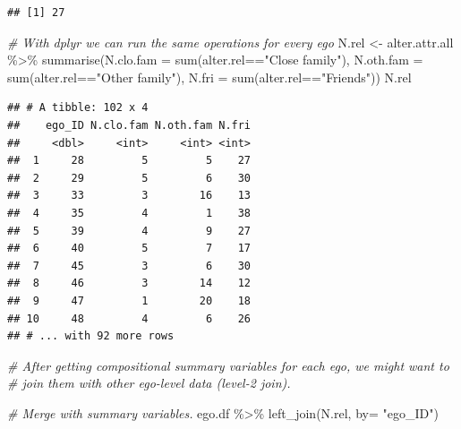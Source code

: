 \documentclass[
]{book}
\newenvironment{Shaded}{\begin{snugshade}}{\end{snugshade}}
\newcommand{\AttributeTok}[1]{\textcolor[rgb]{0.77,0.63,0.00}{#1}}
\newcommand{\CommentTok}[1]{\textcolor[rgb]{0.56,0.35,0.01}{\textit{#1}}}
\newcommand{\FunctionTok}[1]{\textcolor[rgb]{0.00,0.00,0.00}{#1}}
\newcommand{\NormalTok}[1]{#1}
\newcommand{\OtherTok}[1]{\textcolor[rgb]{0.56,0.35,0.01}{#1}}
\newcommand{\SpecialCharTok}[1]{\textcolor[rgb]{0.00,0.00,0.00}{#1}}
\newcommand{\StringTok}[1]{\textcolor[rgb]{0.31,0.60,0.02}{#1}}
\begin{document}
\begin{verbatim}
## [1] 27
\end{verbatim}

\begin{Shaded}
\begin{Highlighting}[]
\CommentTok{\# With dplyr we can run the same operations for every ego}
\NormalTok{N.rel }\OtherTok{\textless{}{-}}\NormalTok{ alter.attr.all }\SpecialCharTok{\%\textgreater{}\%}
  \FunctionTok{summarise}\NormalTok{(}\AttributeTok{N.clo.fam =} \FunctionTok{sum}\NormalTok{(alter.rel}\SpecialCharTok{==}\StringTok{"Close family"}\NormalTok{),}
            \AttributeTok{N.oth.fam =} \FunctionTok{sum}\NormalTok{(alter.rel}\SpecialCharTok{==}\StringTok{"Other family"}\NormalTok{),}
            \AttributeTok{N.fri =} \FunctionTok{sum}\NormalTok{(alter.rel}\SpecialCharTok{==}\StringTok{"Friends"}\NormalTok{))}
\NormalTok{N.rel}
\end{Highlighting}
\end{Shaded}

\begin{verbatim}
## # A tibble: 102 x 4
##    ego_ID N.clo.fam N.oth.fam N.fri
##     <dbl>     <int>     <int> <int>
##  1     28         5         5    27
##  2     29         5         6    30
##  3     33         3        16    13
##  4     35         4         1    38
##  5     39         4         9    27
##  6     40         5         7    17
##  7     45         3         6    30
##  8     46         3        14    12
##  9     47         1        20    18
## 10     48         4         6    26
## # ... with 92 more rows
\end{verbatim}

\begin{Shaded}
\begin{Highlighting}[]
\CommentTok{\# After getting compositional summary variables for each ego, we might want to}
\CommentTok{\# join them with other ego{-}level data (level{-}2 join).}

\CommentTok{\# Merge with summary variables.}
\NormalTok{ego.df }\SpecialCharTok{\%\textgreater{}\%}
  \FunctionTok{left\_join}\NormalTok{(N.rel, }\AttributeTok{by=} \StringTok{"ego\_ID"}\NormalTok{)}
\end{Highlighting}
\end{Shaded}
\end{document}
